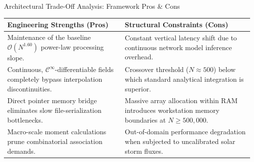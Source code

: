 \documentclass[presentation,10pt,aspectratio=169]{beamer}
\begin{document}
\begin{frame}{Architectural Trade-Off Analysis: Framework Pros \& Cons}
    \begin{table}
        \small
        \centering
        \begin{tabular}{p{} p{}}
            \toprule
            \textbf{Engineering Strengths (Pros)} & \textbf{Structural Constraints (Cons)} \\
            \midrule
            Maintenance of the baseline $\mathcal{O}(N^{1.60})$ power-law processing slope. & Constant vertical latency shift due to continuous network model inference overhead. \\ \addlinespace
            Continuous, $\mathcal{C}^\infty$-differentiable fields completely bypass interpolation discontinuities. & Crossover threshold ($N \approx 500$) below which standard analytical integration is superior. \\ \addlinespace
            Direct pointer memory bridge eliminates slow file-serialization bottlenecks. & Massive array allocation within RAM introduces workstation memory boundaries at $N \ge 500,000$. \\ \addlinespace
            Macro-scale moment calculations prune combinatorial association demands. & Out-of-domain performance degradation when subjected to uncalibrated solar storm fluxes. \\
            \bottomrule
        \end{tabular}
    \end{table}
\end{frame}
\end{document}
